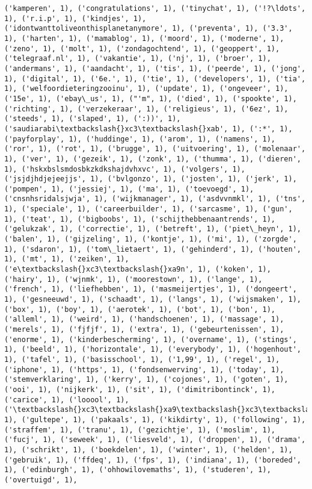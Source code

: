 \documentclass{article}
\begin{document}
\begin{Verbatim}[commandchars=\\\{\}]
('kamperen', 1), ('congratulations', 1), ('tinychat', 1), ('!?\ldots', 1), ('r.i.p', 1), ('kindjes', 1), ('idontwanttoliveonthisplanetanymore', 1), ('preventa', 1), ('3.3', 1), ('harten', 1), ('mamablog', 1), ('moord', 1), ('moderne', 1), ('zeno', 1), ('molt', 1), ('zondagochtend', 1), ('geoppert', 1), ('telegraaf.nl', 1), ('vakantie', 1), ('nj', 1), ('broer', 1), ('andermans', 1), ('aandacht', 1), ('tis', 1), ('peerde', 1), ('jong', 1), ('digital', 1), ('6e.', 1), ('tie', 1), ('developers', 1), ('tia', 1), ('welfoordieteringzooinu', 1), ('update', 1), ('ongeveer', 1), ('15e', 1), ('ebay\_us', 1), ("'m", 1), ('died', 1), ('spookte', 1), ('richting', 1), ('verzekeraar', 1), ('religieus', 1), ('6ez', 1), ('steeds', 1), ('slaped', 1), (':))', 1), ('saudiarabi\textbackslash{}xc3\textbackslash{}xab', 1), (':*', 1), ('payforplay', 1), ('huddinge', 1), ('arom', 1), ('namens', 1), ('ror', 1), ('rot', 1), ('brugge', 1), ('uitvoering', 1), ('molenaar', 1), ('ver', 1), ('gezeik', 1), ('zonk', 1), ('thumma', 1), ('dieren', 1), ('hskxbslsmdosbkzkdkshajdvhxvc', 1), ('volgers', 1), ('jsjdjhdjejeejjs', 1), ('bvlgonzo', 1), ('josten', 1), ('jerk', 1), ('pompen', 1), ('jessiej', 1), ('ma', 1), ('toevoegd', 1), ('cnsnhsridalsjwja', 1), ('wijkmanager', 1), ('asdvvnmkl', 1), ('tns', 1), ('speciale', 1), ('careerbuilder', 1), ('sarcasme', 1), ('gun', 1), ('teat', 1), ('bigboobs', 1), ('schijthebbenaantrends', 1), ('gelukzak', 1), ('correctie', 1), ('betreft', 1), ('piet\_heyn', 1), ('balen', 1), ('gijzeling', 1), ('kontje', 1), ('mi', 1), ('zorgde', 1), ('sdaron', 1), ('tom\_lietaert', 1), ('gehinderd', 1), ('houten', 1), ('mt', 1), ('zeiken', 1), ('e\textbackslash{}xc3\textbackslash{}xa9n', 1), ('koken', 1), ('hairy', 1), ('wjnmk', 1), ('moorestown', 1), ('lange', 1), ('french', 1), ('liefhebben', 1), ('masmeijertjes', 1), ('dongeert', 1), ('gesneeuwd', 1), ('schaadt', 1), ('langs', 1), ('wijsmaken', 1), ('box', 1), ('boy', 1), ('aerotek', 1), ('bot', 1), ('bon', 1), ('alleml', 1), ('weird', 1), ('handschoenen', 1), ('massage', 1), ('merels', 1), ('fjfjf', 1), ('extra', 1), ('gebeurtenissen', 1), ('enorme', 1), ('kinderbescherming', 1), ('overname', 1), ('stings', 1), ('beeld', 1), ('horizontale', 1), ('everybody', 1), ('hogenhout', 1), ('tafel', 1), ('basisschool', 1), ('1,99', 1), ('regel', 1), ('iphone', 1), ('https', 1), ('fondsenwerving', 1), ('today', 1), ('stemverklaring', 1), ('kerry', 1), ('cojones', 1), ('goten', 1), ('ooi', 1), ('nijkerk', 1), ('sit', 1), ('dimitribontinck', 1), ('carice', 1), ('looool', 1), ('\textbackslash{}xc3\textbackslash{}xa9\textbackslash{}xc3\textbackslash{}xa9n', 1), ('gultepe', 1), ('pakaals', 1), ('kikdirty', 1), ('following', 1), ('straffem', 1), ('tranu', 1), ('gezichtje', 1), ('moslim', 1), ('fucj', 1), ('seweek', 1), ('liesveld', 1), ('droppen', 1), ('drama', 1), ('schrikt', 1), ('boekdelen', 1), ('winter', 1), ('helden', 1), ('gebruik', 1), ('ffdeq', 1), ('fps', 1), ('indiana', 1), ('boreded', 1), ('edinburgh', 1), ('ohhowilovemaths', 1), ('studeren', 1), ('overtuigd', 1), 
\end{Verbatim}
\end{document}
